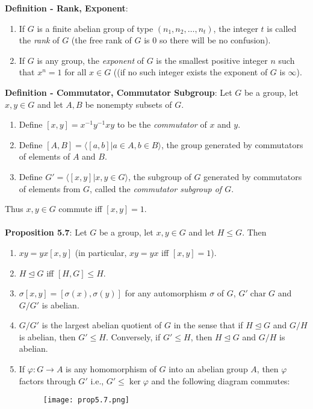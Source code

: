 \documentclass{article}
\DeclareMathOperator{\Char}{char}
\begin{document}
\textbf{Definition - Rank, Exponent}: \begin{enumerate}
    \item If $G$ is a finite abelian group of type $(n_1, n_2, \dots, n_t)$, the integer $t$ is called the \textit{rank} of $G$ (the free rank of $G$ is 0 so there will be no confusion).
    \item If $G$ is any group, the \textit{exponent} of $G$ is the smallest positive integer $n$ such that $x^n = 1$ for all $x \in G$ ((if no such integer exists the exponent of $G$ is $\infty$).
\end{enumerate} $ $ \\
\textbf{Definition - Commutator, Commutator Subgroup}: Let $G$ be a group, let $x, y \in G$ and let $A, B$ be nonempty subsets of $G$. \begin{enumerate}
    \item Define $[x, y] = x^{-1}y^{-1}xy$ to be the \textit{commutator} of $x$ and $y$.
    \item Define $[A, B] = \langle [a, b] | a \in A, b \in B \rangle$, the group generated by commutators of elements of $A$ and $B$.
    \item Define $G' = \langle [x, y] | x, y \in G \rangle$, the subgroup of $G$ generated by commutators of elements from $G$, called the \textit{commutator subgroup of $G$}.
\end{enumerate} $ $ \\
Thus $x, y \in G$ commute iff $[x, y] = 1$. \\ \\
\textbf{Proposition 5.7}: Let $G$ be a group, let $x, y \in G$ and let $H \leq G$. Then \begin{enumerate}
    \item $xy = yx[x, y]$ (in particular, $xy = yx$ iff $[x, y] = 1$).
    \item $H \trianglelefteq G$ iff $[H, G] \leq H$.
    \item $\sigma[x, y] = [\sigma(x), \sigma(y)]$ for any automorphism $\sigma$ of $G$, $G' \Char G$ and $G/G'$ is abelian.
    \item $G/G'$ is the largest abelian quotient of $G$ in the sense that if $H \trianglelefteq G$ and $G/H$ is abelian, then $G' \leq H$. Conversely, if $G' \leq H$, then $H \trianglelefteq G$ and $G/H$ is abelian. 
    \item If $\varphi: G \rightarrow A$ is any homomorphism of $G$ into an abelian group $A$, then $\varphi$ factors through $G'$ i.e., $G' \leq \ker{\varphi}$ and the following diagram commutes: \begin{figure}[H]
\begin{center}
\texttt{[image: prop5.7.png]}
\end{center}
\end{figure}
\end{enumerate} $ $ \\
\end{document}
